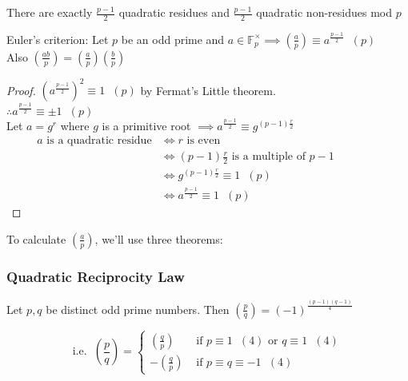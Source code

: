\documentclass[11pt]{article}
\begin{document}
\begin{corollary}
	There are exactly $\frac{p-1}{2}$ quadratic residues and $\frac{p-1}{2}$ quadratic non-residues mod $p$
\end{corollary}

\begin{definition}
	Euler's criterion: Let $p$ be an odd prime and $a \in \mathbb{F}^\times_p \implies (\frac{a}{p}) \equiv a^{\frac{p-1}{2}} \hspace{7pt} (p)$\\
	Also $(\frac{ab}{p}) = (\frac{a}{p}) (\frac{b}{p})$
\end{definition}
\begin{proof}
	$(a^{\frac{p-1}{2}})^2 \equiv 1 \hspace{7pt} (p)$ by Fermat's Little theorem.\\[1em] 
	\hspace{25pt}$\therefore a^\frac{p-1}{2} \equiv \pm 1 \hspace{7pt} (p)$\\[0.5em]
	Let $a= g^r $ where $g$ is a primitive root $\implies a^{\frac{p-1}{2}} \equiv g^{(p-1)\frac{r}{2}}$
	\begin{align*}	
		a \text{ is a quadratic residue} &\iff r \text{ is even} &&&&&\\
		&\iff (p-1)\frac{r}{2} \text{ is a multiple of } p-1 \\
		&\iff g^{(p-1)\frac{r}{2}} \equiv 1 \hspace{7pt} (p)\\
		&\iff a^{\frac{p-1}{2}} \equiv 1 \hspace{7pt} (p)
	\end{align*}
\end{proof}
To calculate $(\frac{a}{p})$, we'll use three theorems:

\subsubsection{Quadratic Reciprocity Law}
Let $p,q$ be distinct odd prime numbers. Then $(\frac{p}{q}) = (-1)^{\frac{(p-1)(q-1)}{4}}$




\large
\begin{equation*}
	\text{i.e.} \hspace{7pt} (\frac{p}{q}) =  
	\begin{cases}
		(\frac{q}{p}) &\text{ if } p \equiv 1 \hspace{7pt} (4) \text{ or } q \equiv 1\hspace{7pt} (4)\\
		-(\frac{q}{p}) &\text{ if } p \equiv q \equiv -1 \hspace{7pt} (4)
	\end{cases}
\end{equation*}
\end{document}
